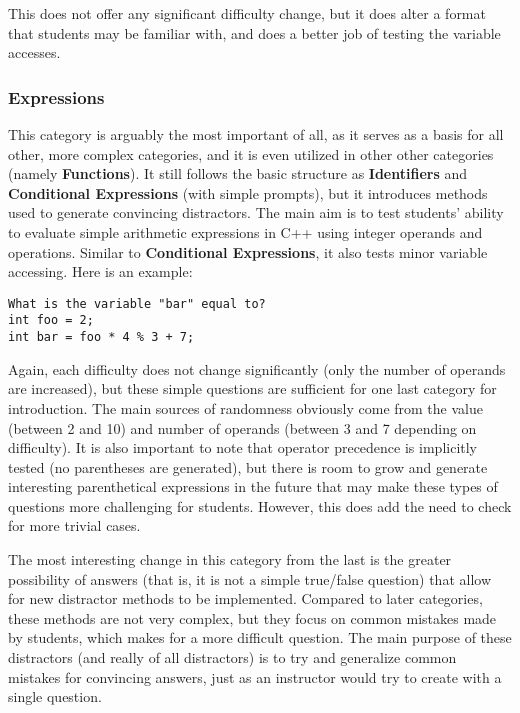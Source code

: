 \documentclass{article}
\begin{document}
This does not offer any significant difficulty change, but it does alter a format that students may be familiar with, and does a better job of testing the variable accesses.

\subsubsection{Expressions} \label{subsubsec-expressions}
This category is arguably the most important of all, as it serves as a basis for all other, more complex categories, and it is even utilized in other other categories
(namely \textbf{Functions}). It still follows the basic structure as \textbf{Identifiers} and \textbf{Conditional Expressions} (with simple prompts), but it introduces methods used to generate convincing distractors.
The main aim is to test students' ability to evaluate simple arithmetic expressions in C++ using integer operands and operations. Similar to \textbf{Conditional Expressions}, it also
tests minor variable accessing. Here is an example:

\begin{lstlisting}
What is the variable "bar" equal to? 
int foo = 2; 
int bar = foo * 4 % 3 + 7; 
\end{lstlisting}


Again, each difficulty does not change significantly (only the number of operands are increased), but these simple questions are sufficient for one last category for introduction.
The main sources of randomness obviously come from the value (between 2 and 10) and number of operands (between 3 and 7 depending on difficulty). It is also important to note that
operator precedence is implicitly tested (no parentheses are generated), but there is room to grow and generate interesting parenthetical expressions in the future that may make
these types of questions more challenging for students. However, this does add the need to check for more trivial cases. 

The most interesting change in this category from the last is the greater possibility of answers (that is, it is not a simple true/false question) that allow for new distractor methods to be implemented. Compared to later categories, these methods are not very complex, but they focus on common mistakes made by students, which makes for a more difficult question. The main
purpose of these distractors (and really of all distractors) is to try and generalize common mistakes for convincing answers, just as an instructor would try to create with a single question. 
\end{document}
